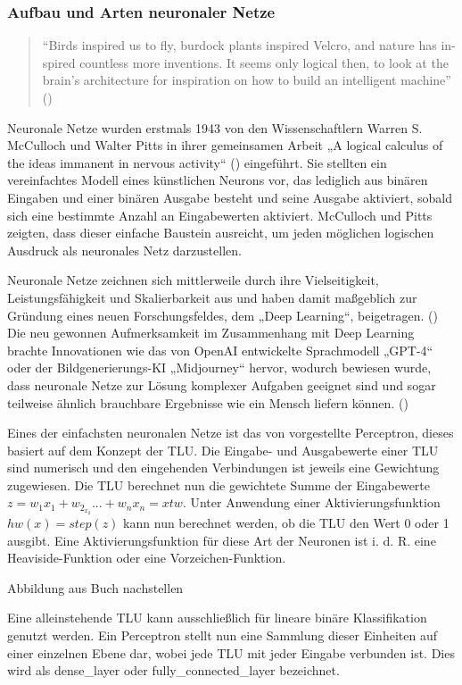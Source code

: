 \subsubsection{Aufbau und Arten neuronaler Netze}

\begin{quote}
"`Birds inspired us to fly, burdock plants inspired Velcro, and nature has in- spired countless more inventions. It seems only logical then, to look at the brain’s architecture for inspiration on how to build an intelligent machine"' (\cite[S. 279]{Geron2019})
\end{quote}

Neuronale Netze wurden erstmals 1943 von den Wissenschaftlern Warren S. McCulloch und Walter Pitts in ihrer gemeinsamen Arbeit „A logical calculus of the ideas immanent in nervous activity“ (\cite{McCulloch1943}) eingeführt. Sie stellten ein vereinfachtes Modell eines künstlichen Neurons vor, das lediglich aus binären Eingaben und einer binären Ausgabe besteht und seine Ausgabe aktiviert, sobald sich eine bestimmte Anzahl an Eingabewerten aktiviert. McCulloch und Pitts zeigten, dass dieser einfache Baustein ausreicht, um jeden möglichen logischen Ausdruck als neuronales Netz darzustellen.

Neuronale Netze zeichnen sich mittlerweile durch ihre Vielseitigkeit, Leistungsfähigkeit und Skalierbarkeit aus und haben damit maßgeblich zur Gründung eines neuen Forschungsfeldes, dem „Deep Learning“, beigetragen. (\cite{Geron2019}) Die neu gewonnen Aufmerksamkeit im Zusammenhang mit Deep Learning brachte Innovationen wie das von OpenAI entwickelte Sprachmodell „GPT-4“ oder der Bildgenerierungs-KI „Midjourney“ hervor, wodurch bewiesen wurde, dass neuronale Netze zur Lösung komplexer Aufgaben geeignet sind und sogar teilweise ähnlich brauchbare Ergebnisse wie ein Mensch liefern können. (\cite{OpenAI2024})

Eines der einfachsten neuronalen Netze ist das von \cite{Rosenblatt1958} vorgestellte Perceptron, dieses basiert auf dem Konzept der \ac{TLU}. Die Eingabe- und Ausgabewerte einer \ac{TLU} sind numerisch und den eingehenden Verbindungen ist jeweils eine Gewichtung zugewiesen. Die \ac{TLU} berechnet nun die gewichtete Summe der Eingabewerte \(z=w_1x_1+w_2_x_2 ... +w_nx_n=xtw\). Unter Anwendung einer Aktivierungsfunktion \(hw(x)=step(z)\) kann nun berechnet werden, ob die \ac{TLU} den Wert 0 oder 1 ausgibt. Eine Aktivierungsfunktion für diese Art der Neuronen ist i. d. R. eine Heaviside-Funktion oder eine Vorzeichen-Funktion. \cite[S. 284 ff.]{Geron2019}

Abbildung aus Buch nachstellen

Eine alleinstehende \ac{TLU} kann ausschließlich für lineare binäre Klassifikation genutzt werden. Ein Perceptron stellt nun eine Sammlung dieser Einheiten auf einer einzelnen Ebene dar, wobei jede \ac{TLU} mit jeder Eingabe verbunden ist. Dies wird als \gls{dense_layer} oder \gls{fully_connected_layer} bezeichnet. 